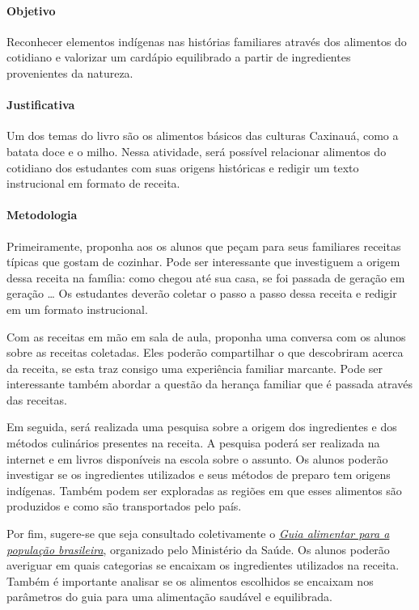 \documentclass[11pt]{extarticle}
\begin{document}
\paragraph{Objetivo} Reconhecer elementos indígenas nas histórias familiares através dos alimentos do cotidiano e valorizar um cardápio equilibrado a partir de ingredientes provenientes da natureza.

\paragraph{Justificativa} Um dos temas do livro são os alimentos básicos das culturas Caxinauá, como a batata doce e o milho. Nessa atividade, será possível relacionar alimentos do cotidiano dos estudantes com suas origens históricas e redigir um texto instrucional em formato de receita.

\paragraph{Metodologia} Primeiramente, proponha aos os alunos que peçam para seus familiares receitas típicas que gostam de cozinhar. Pode ser interessante que investiguem a origem dessa receita na família: como chegou até sua casa, se foi passada de geração em geração \ldots{} Os estudantes deverão coletar o passo a passo dessa receita e redigir em um formato instrucional.

Com as receitas em mão em sala de aula, proponha uma conversa com os alunos sobre as receitas coletadas. Eles poderão compartilhar o que descobriram acerca da receita, se esta traz consigo uma experiência familiar marcante. Pode ser interessante também abordar a questão da herança familiar que é passada através das receitas.

Em seguida, será realizada uma pesquisa sobre a origem dos ingredientes e dos métodos culinários presentes na receita. A pesquisa poderá ser realizada na internet e em livros disponíveis na escola sobre o assunto. Os alunos poderão investigar se os ingredientes utilizados e seus métodos de preparo tem origens indígenas. Também podem ser exploradas as regiões em que esses alimentos são produzidos e como são transportados pelo país.

Por fim, sugere-se que seja consultado coletivamente o \href{https://bvsms.saude.gov.br/bvs/publicacoes/guia_alimentar_populacao_brasileira_2ed.pdf}{\textit{Guia alimentar para a população brasileira}}, organizado pelo Ministério da Saúde. Os alunos poderão averiguar em quais categorias se encaixam os ingredientes utilizados na receita. Também é importante analisar se os alimentos escolhidos se encaixam nos parâmetros do guia para uma alimentação saudável e equilibrada.
\end{document}
